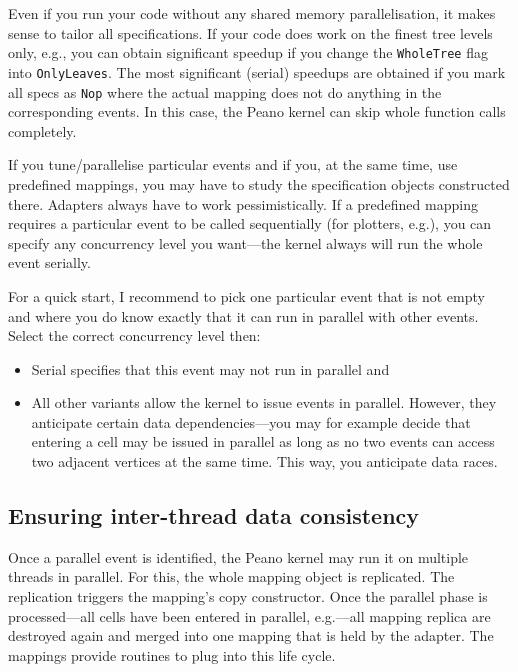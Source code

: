 \begin{remark}
Even if you run your code without any shared memory parallelisation, it makes
sense to tailor all specifications. If your code does work on the finest tree
levels only, e.g., you can obtain significant speedup if you change the
\texttt{WholeTree} flag into \texttt{OnlyLeaves}. The most significant (serial)
speedups are obtained if you mark all specs as \texttt{Nop} where the actual
mapping does not do anything in the corresponding events. In this case, the
Peano kernel can skip whole function calls completely.
\end{remark}

\begin{remark}
If you tune/parallelise particular events and if you, at the same time, use
predefined mappings, you may have to study the specification objects
constructed there. Adapters always have to work pessimistically. If a predefined
mapping requires a particular event to be called sequentially (for plotters,
e.g.), you can specify any concurrency level you want---the kernel always will
run the whole event serially.
\end{remark}


For a quick start, I recommend to pick one particular event that is not
empty and where you do know exactly that it can run in parallel with other
events.
Select the correct concurrency level then:
\begin{itemize}
  \item Serial specifies that this event may not run in parallel and
  \item All other variants allow the kernel to issue events in parallel.
  However, they anticipate certain data dependencies---you may for example
  decide that entering a cell may be issued in parallel as long as no two events
  can access two adjacent vertices at the same time. This way, you anticipate
  data races.
\end{itemize}



\subsection{Ensuring inter-thread data consistency}

Once a parallel event is identified, the Peano kernel may run it on multiple
threads in parallel.
For this, the whole mapping object is replicated. 
The replication triggers the mapping's copy constructor.
Once the parallel phase is processed---all cells have been entered in parallel,
e.g.---all mapping replica are destroyed again and merged into one mapping that
is held by the adapter.
The mappings provide routines to plug into this life cycle.

